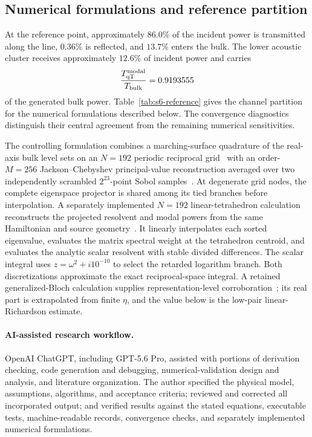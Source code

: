 \documentclass[10pt,aps,pre,reprint,floatfix,notitlepage,nofootinbib]{revtex4-2}
\newcommand{\qT}{\mathrm{qT}}
\begin{document}
\subsection{Numerical formulations and reference partition}
\label{sec:s6-reference}

At the reference point, approximately $86.0\%$ of the incident power is transmitted along the line, $0.36\%$ is reflected, and $13.7\%$ enters the bulk. The lower acoustic cluster receives approximately $12.6\%$ of incident power and carries
\begin{equation}
 \frac{T_{\qT}^{\rm modal}}{T_{\rm bulk}}
 =0.9193555
 \label{eq:s6-generated-share}
\end{equation}
of the generated bulk power. Table~\ref{tab:s6-reference} gives the channel partition for the numerical formulations described below. The convergence diagnostics distinguish their central agreement from the remaining numerical sensitivities.

The controlling formulation combines a marching-surface quadrature of the real-axis bulk level sets on an $N=192$ periodic reciprocal grid~\cite{LorensenCline1987} with an order-$M=256$ Jackson--Chebyshev principal-value reconstruction averaged over two independently scrambled $2^{23}$-point Sobol samples~\cite{Weisse2006}. At degenerate grid nodes, the complete eigenspace projector is shared among its tied branches before interpolation. A separately implemented $N=192$ linear-tetrahedron calculation reconstructs the projected resolvent and modal powers from the same Hamiltonian and source geometry~\cite{Blochl1994}. It linearly interpolates each sorted eigenvalue, evaluates the matrix spectral weight at the tetrahedron centroid, and evaluates the analytic scalar resolvent with stable divided differences. The scalar integral uses $z=\omega^2+i10^{-10}$ to select the retarded logarithm branch. Both discretizations approximate the exact reciprocal-space integral. A retained generalized-Bloch calculation supplies representation-level corroboration~\cite{Ong2018}; its real part is extrapolated from finite $\eta$, and the value below is the low-pair linear-Richardson estimate.

\paragraph{AI-assisted research workflow.}
OpenAI ChatGPT, including GPT-5.6 Pro, assisted with portions of derivation checking, code generation and debugging, numerical-validation design and analysis, and literature organization. The author specified the physical model, assumptions, algorithms, and acceptance criteria; reviewed and corrected all incorporated output; and verified results against the stated equations, executable tests, machine-readable records, convergence checks, and separately implemented numerical formulations.
\end{document}
